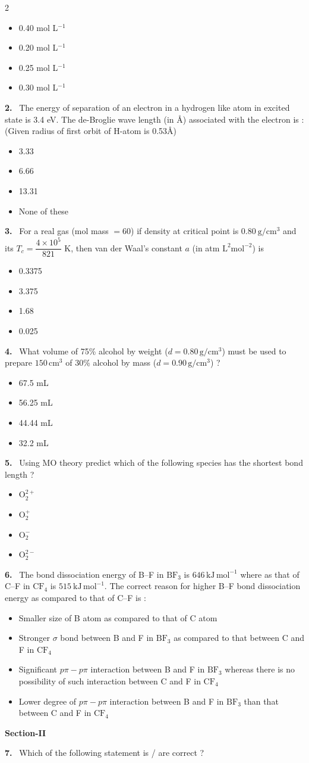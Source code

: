 \documentclass[10pt]{extarticle}
\newcommand{\sect}[1]{\par\smallskip\noindent\textbf{#1}\par}
\newcommand{\qn}[1]{\par\smallskip\noindent\textbf{#1.}~}
\newenvironment{qoptions}{\begin{itemize}[leftmargin=1.8em,itemsep=1pt,topsep=2pt,label={}]}{\end{itemize}}
\newcommand{\opt}[2]{\item[(#1)] #2}
\begin{document}
\begin{multicols}{2}
\begin{qoptions}
\opt{A}{0.40 mol L$^{-1}$}
\opt{B}{0.20 mol L$^{-1}$}
\opt{C}{0.25 mol L$^{-1}$}
\opt{D}{0.30 mol L$^{-1}$}
\end{qoptions}
\qn{2} The energy of separation of an electron in a hydrogen like atom in excited state is 3.4 eV. The de-Broglie wave length (in \AA) associated with the electron is :\\
(Given radius of first orbit of H-atom is 0.53\AA)
\begin{qoptions}
\opt{A}{3.33}
\opt{B}{6.66}
\opt{C}{13.31}
\opt{D}{None of these}
\end{qoptions}
\qn{3} For a real gas (mol mass $=60$) if density at critical point is $0.80\ \mathrm{g/cm^3}$ and its $T_c=\dfrac{4\times10^5}{821}$ K, then van der Waal's constant $a$ (in atm $\mathrm{L^2mol^{-2}}$) is
\begin{qoptions}
\opt{A}{0.3375}
\opt{B}{3.375}
\opt{C}{1.68}
\opt{D}{0.025}
\end{qoptions}
\qn{4} What volume of 75\% alcohol by weight ($d=0.80\,\mathrm{g/cm^3}$) must be used to prepare $150\,\mathrm{cm^3}$ of 30\% alcohol by mass ($d=0.90\,\mathrm{g/cm^3}$) ?
\begin{qoptions}
\opt{A}{67.5 mL}
\opt{B}{56.25 mL}
\opt{C}{44.44 mL}
\opt{D}{32.2 mL}
\end{qoptions}
\qn{5} Using MO theory predict which of the following species has the shortest bond length ?
\begin{qoptions}
\opt{A}{$\mathrm{O_2^{2+}}$}
\opt{B}{$\mathrm{O_2^{+}}$}
\opt{C}{$\mathrm{O_2^{-}}$}
\opt{D}{$\mathrm{O_2^{2-}}$}
\end{qoptions}
\qn{6} The bond dissociation energy of B--F in $\mathrm{BF_3}$ is $646\,\mathrm{kJ\,mol^{-1}}$ where as that of C--F in $\mathrm{CF_4}$ is $515\ \mathrm{kJ\,mol^{-1}}$. The correct reason for higher B--F bond dissociation energy as compared to that of C--F is :
\begin{qoptions}
\opt{A}{Smaller size of B atom as compared to that of C atom}
\opt{B}{Stronger $\sigma$ bond between B and F in $\mathrm{BF_3}$ as compared to that between C and F in $\mathrm{CF_4}$}
\opt{C}{Significant $p\pi-p\pi$ interaction between B and F in $\mathrm{BF_3}$ whereas there is no possibility of such interaction between C and F in $\mathrm{CF_4}$}
\opt{D}{Lower degree of $p\pi-p\pi$ interaction between B and F in $\mathrm{BF_3}$ than that between C and F in $\mathrm{CF_4}$}
\end{qoptions}
\sect{Section-II}
\qn{7} Which of the following statement is / are correct ?

\end{multicols}
\end{document}
